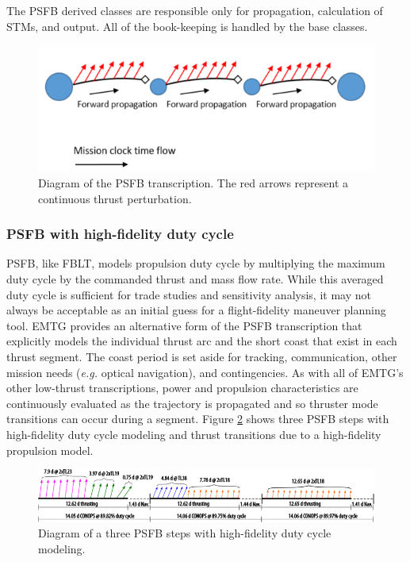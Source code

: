 The \ac{PSFB} derived classes are responsible only for propagation, calculation of \ac{STM}s, and output. All of the book-keeping is handled by the base classes.

\begin{figure}
	\centering
	\includegraphics[width=0.8\linewidth]{./mission/PSFB.png}
	\caption{\label{fig:PSFB} Diagram of the \ac{PSFB} transcription. The red arrows represent a continuous thrust perturbation.}
\end{figure}

\FloatBarrier

\subsubsection{PSFB with high-fidelity duty cycle}
\label{subsubsec:PSFB_with_high_fidelity_duty_cycle}

\ac{PSFB}, like \ac{FBLT}, models propulsion duty cycle by multiplying the maximum duty cycle by the commanded thrust and mass flow rate. While this averaged duty cycle is sufficient for trade studies and sensitivity analysis, it may not always be acceptable as an initial guess for a flight-fidelity maneuver planning tool. \ac{EMTG} provides an alternative form of the \ac{PSFB} transcription that explicitly models the individual thrust arc and the short coast that exist in each thrust segment. The coast period is set aside for tracking, communication, other mission needs (\textit{e.g.} optical navigation), and contingencies. As with all of \ac{EMTG}'s other low-thrust transcriptions, power and propulsion characteristics are continuously evaluated as the trajectory is propagated and so thruster mode transitions can occur during a segment. Figure \ref{fig:PSFB_hifi_duty} shows three \ac{PSFB} steps with high-fidelity duty cycle modeling and thrust transitions due to a high-fidelity propulsion model.

\begin{figure}
	\centering
	\includegraphics[width=0.8\linewidth]{./mission/PSFB_hifi_duty_cycle.png}
	\caption{\label{fig:PSFB_hifi_duty} Diagram of a three \ac{PSFB} steps with high-fidelity duty cycle modeling.}
\end{figure}

